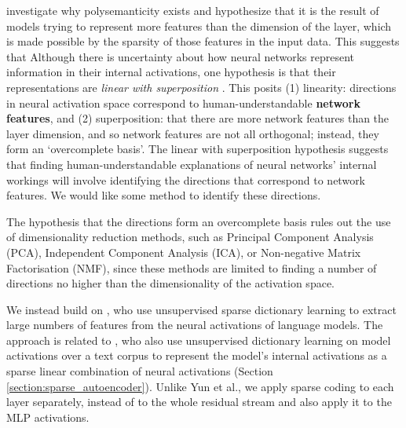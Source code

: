\citet{elhage2022toy} investigate why polysemanticity exists and hypothesize that it is the result of models trying to represent more features than the dimension of the layer, which is made possible by the sparsity of those features in the input data. This suggests that 
Although there is uncertainty about how neural networks represent information in their internal activations, one hypothesis is that their representations are \emph{linear with superposition} \citep{elhage2021mathematical, elhage2022toy, yun2023transformer, gurnee2023finding}. This posits (1) linearity: directions in neural activation space correspond to human-understandable \textbf{network features}, and (2) superposition: that there are more network features than the layer dimension, and so network features are not all orthogonal; instead, they form an `overcomplete basis'. The linear with superposition hypothesis suggests that finding human-understandable explanations of neural networks' internal workings will involve identifying the directions that correspond to network features. We would like some method to identify these directions. 

The hypothesis that the directions form an overcomplete basis rules out the use of dimensionality reduction methods, such as Principal Component Analysis (PCA), Independent Component Analysis (ICA), or Non-negative Matrix Factorisation (NMF), since these methods are limited to finding a number of directions no higher than the dimensionality of the activation space. 

We instead build on \citet{taking_features_out_of_superposition}, who use unsupervised sparse dictionary learning \citep{olshausen1997sparse} to extract large numbers of features from the neural activations of language models. The approach is related to \citep{yun2023transformer}, who also use unsupervised dictionary learning on model activations over a text corpus to represent the model's internal activations as a sparse linear combination of neural activations (Section \ref{section:sparse_autoencoder}). Unlike Yun et al., we apply sparse coding to each layer separately, instead of to the whole residual stream and also apply it to the MLP activations. 




